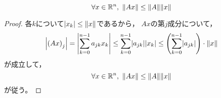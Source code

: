 \documentclass[b5paper,oneside,openany]{ltjsbook} %
\begin{document}
\begin{prop}
    \begin{equation}
        \forall x\in \R^n,\ \norm{Ax}\leq \norm{A}\norm{x}
    \end{equation}
    \begin{proof}
        各$k$について$\abs{x_k}\leq \norm{x}$であるから，
        $Ax$の第$j$成分について，
        \begin{equation}
            \abs{\pare{Ax}_j}=\abs{\sum_{k=0}^{n-1}a_{jk}x_k}
            \leq \sum_{k=0}^{n-1} \abs{a_{jk}}\abs{x_k}
            \leq \pare{\sum_{k=0}^{n-1}\abs{a_{jk}}}\cdot \norm{x}
        \end{equation}
        が成立して，
        \begin{equation}
            \forall x\in \R^n,\ \norm{Ax}\leq \norm{A}\norm{x}
        \end{equation}
        が従う。
    \end{proof}
\end{prop}
\end{document}
